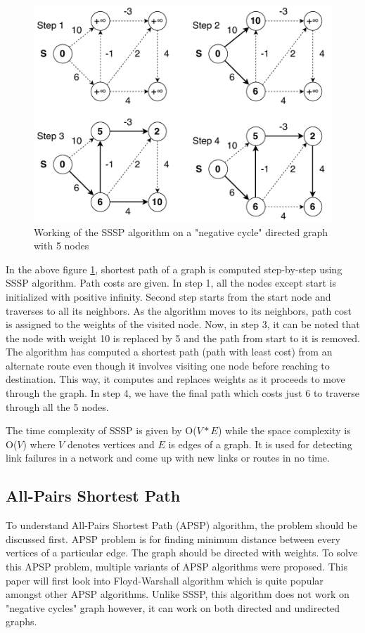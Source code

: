 \documentclass[journal,twoside,web]{ieeecolor}
\begin{document}
\begin{figure}[!h]
    \centerline{\includegraphics[scale=0.55]{figures/sssp.pdf}}
    \caption{Working of the SSSP algorithm on a "negative cycle" directed graph with 5 nodes}
    \label{fig2}
\end{figure}

In the above figure \ref{fig2}, shortest path of a graph is computed step-by-step using SSSP algorithm. Path costs are given. In step 1, all the nodes except start is initialized with positive infinity. Second step starts from the start node and traverses to all its neighbors. As the algorithm moves to its neighbors, path cost is assigned to the weights of the visited node. Now, in step 3, it can be noted that the node with weight 10 is replaced by 5 and the path from start to it is removed. The algorithm has computed a shortest path (path with least cost) from an alternate route even though it involves visiting one node before reaching to destination. This way, it computes and replaces weights as it proceeds to move through the graph. In step 4, we have the final path which costs just 6 to traverse through all the 5 nodes.

The time complexity of SSSP is given by O($V*E$) while the space complexity is O($V$) where $V$ denotes vertices and $E$ is edges of a graph. It is used for detecting link failures in a network and come up with new links or routes in no time.

\subsection{All-Pairs Shortest Path}
To understand All-Pairs Shortest Path (APSP) algorithm, the problem should be discussed first. APSP problem is for finding minimum distance between every vertices of a particular edge. The graph should be directed with weights. To solve this APSP problem, multiple variants of APSP algorithms were proposed\cite{43, 44, 45, 46}. This paper will first look into Floyd-Warshall algorithm which is quite popular amongst other APSP algorithms. Unlike SSSP, this algorithm does not work on "negative cycles" graph however, it can work on both directed and undirected graphs.
\end{document}
